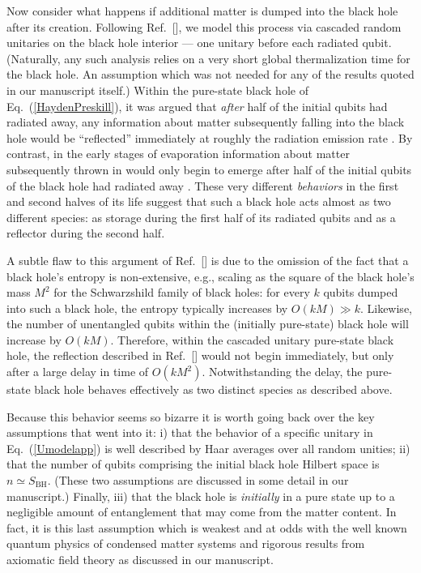 \documentclass[aps,showpacs,prl,12pt]{revtex4}
\begin{document}
Now consider what happens if additional matter is dumped into the 
black hole after its creation. Following Ref.~[], 
we model this process via cascaded random unitaries on the black hole 
interior --- one unitary before each radiated qubit. (Naturally, any
such analysis relies on a very short global thermalization time for
the black hole. An assumption which was not needed for any of the
results quoted in our manuscript itself.) Within the pure-state black
hole of Eq.~(\ref{HaydenPreskill}), it was argued \cite{Hayden07app} 
that {\it after\/} half of the initial qubits had radiated away, any
information about matter subsequently falling into the black hole
would be ``reflected'' immediately at roughly the radiation emission
rate \cite{Hayden07app}. By contrast, in the early stages of evaporation
information about matter subsequently thrown in would only begin
to emerge after half of the initial qubits of the black hole had
radiated away \cite{Hayden07app}. These very different {\it behaviors\/}
in the first and second halves of its life suggest that such a black
hole acts almost as two different species: as storage during the first
half of its radiated qubits and as a reflector during the second half.

A subtle flaw to this argument of Ref.~[] is due
to the omission of the fact that a black hole's entropy is
non-extensive, e.g., scaling as the square of the black hole's
mass $M^2$ for the Schwarzshild family of black holes: for every $k$
qubits dumped into such a black hole, the entropy typically increases
by $O(k M)\gg k$. Likewise, the number of unentangled qubits within
the (initially pure-state) black hole will increase by $O(k M)$.
Therefore, within the cascaded unitary pure-state black hole, the
reflection described in Ref.~[] would not
begin immediately, but only after a large delay in time of
$O(k M^2)$. Notwithstanding the delay, the pure-state black hole
behaves effectively as two distinct species as described above.

Because this behavior seems so bizarre it is worth going back over the
key assumptions that went into it: i) that the behavior of a specific
unitary in Eq.~(\ref{Umodelapp}) is well described by Haar averages over 
all random unities; ii) that the number of qubits comprising the initial
black hole Hilbert space is $n\simeq S_{\text{BH}}$. (These two
assumptions are discussed in some detail in our manuscript.) Finally,
iii) that the black hole is {\it initially\/} in a pure state up
to a negligible amount of entanglement that may come from the matter
content. In fact, it is this last assumption which is weakest and at
odds with the well known quantum physics of condensed matter systems
and rigorous results from axiomatic field theory as discussed in
our manuscript.
\end{document}
